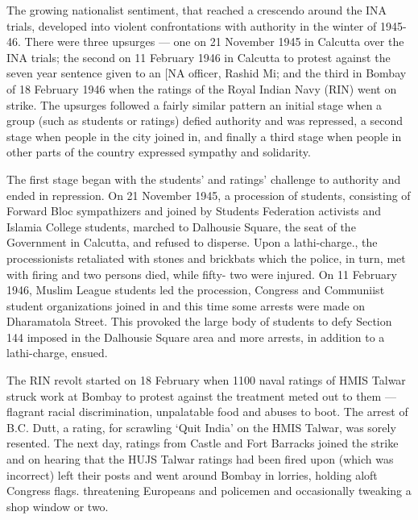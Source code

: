 The growing nationalist sentiment, that reached a crescendo around the INA trials, developed into violent confrontations with authority in the winter of 1945-46. There were three upsurges — one on 21 November 1945 in Calcutta over the INA trials; the second on 11 February 1946 in Calcutta to protest against the seven year sentence given to an [NA officer, Rashid Mi; and the third in Bombay of 18 February 1946 when the ratings of the Royal Indian Navy (RIN) went on strike. The upsurges followed a fairly similar pattern an initial stage when a group (such as students or ratings) defied authority and was repressed, a second stage when people in the city joined in, and finally a third stage when people in other parts of the country expressed sympathy and solidarity. 

The first stage began with the students' and ratings' challenge to authority and ended in repression. On 21 November 1945, a procession of students, consisting of Forward Bloc sympathizers and joined by Students Federation activists and Islamia College students, marched to Dalhousie Square, the seat of the Government in Calcutta, and refused to disperse. Upon a lathi-charge., the processionists retaliated with stones and brickbats which the police, in turn, met with firing and two persons died, while fifty- two were injured. On 11 February 1946, Muslim League students led the procession, Congress and Communiist student organizations joined in and this time some arrests were made on Dharamatola Street. This provoked the large body of students to defy Section 144 imposed in the Dalhousie Square area and more arrests, in addition to a lathi-charge, ensued. 

The RIN revolt started on 18 February when 1100 naval ratings of HMIS Talwar struck work at Bombay to protest against the treatment meted out to them — flagrant racial discrimination, unpalatable food and abuses to boot. The arrest of B.C. Dutt, a rating, for scrawling `Quit India' on the HMIS Talwar, was sorely resented. The next day, ratings from Castle and Fort Barracks joined the strike and on hearing that the HUJS Talwar ratings had been fired upon (which was incorrect) left their posts and went around Bombay in lorries, holding aloft Congress flags. threatening Europeans and policemen and occasionally tweaking a shop window or two. 

